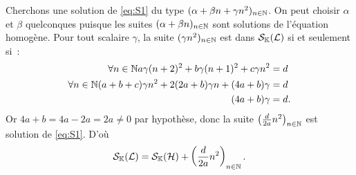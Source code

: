 \begin{itemize}
\begin{itemize}
\begin{equation}
        \end{equation}
        Cherchons une solution de \eqref{eq:S1} du type \((\alpha+\beta n +
        \gamma n^2)_{n \in \mathbb{N}}\). On peut choisir \(\alpha\) et \(\beta\)
        quelconques puisque les suites \((\alpha+\beta n)_{n \in \mathbb{N}}\) sont
        solutions de l'équation homogène. Pour tout scalaire \(\gamma\), la
        suite \((\gamma n^2)_{n \in \mathbb{N}}\) est dans \(\mathcal{S}_{\mathbb{K}}(\mathcal{L})\) si et
        seulement si~:
        \begin{align}
          \forall n \in \mathbb{N} a\gamma(n+2)^2 +b\gamma(n+1)^2 +c\gamma n^2 &=d\\
          \forall n \in \mathbb{N} (a+b+c)\gamma n^2 +2(2a+b)\gamma n +(4a+b)\gamma
          &=d \\
          (4a+b)\gamma &=d.
        \end{align}
        Or \(4a+b=4a-2a=2a \neq 0\) par hypothèse, donc la suite
        \(\left(\frac{d}{2a} n^2\right)_{n \in \mathbb{N}}\) est solution de
        \eqref{eq:S1}. D'où
        \begin{equation}
          \mathcal{S}_{\mathbb{K}}(\mathcal{L}) = \mathcal{S}_{\mathbb{K}}(\mathcal{H}) + \left(\frac{d}{2a} n^2\right)_{n \in \mathbb{N}}.
        \end{equation}
    \end{itemize}
\end{itemize}
